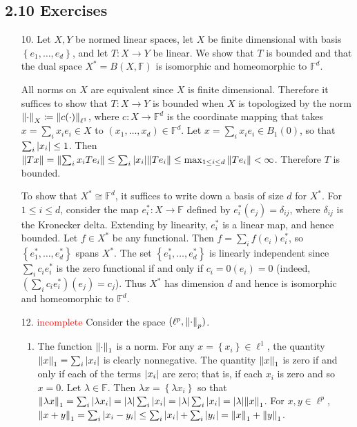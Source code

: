 \documentclass[11pt,leqno]{article}
\theoremstyle{plain}
\theoremstyle{definition}
\numberwithin{equation}{section}
\numberwithin{lem}{section}
\newcommand{\cbr}[1]{\left\{#1\right\}}
\begin{document}
\subsection*{2.10 Exercises}
\begin{enumerate}
  \item[10.] Let $X,Y$ be normed linear spaces, let $X$ be finite dimensional with basis $\cbr{e_1,\dots,e_d}$, and let $T\colon X\to Y$ be linear. We show that $T$ is bounded and that the dual space $X^\ast = B(X,\mathbb F)$ is isomorphic and homeomorphic to $\mathbb F^d$.
  
  All norms on $X$ are equivalent since $X$ is finite dimensional. Therefore it suffices to show that $T\colon X\to Y$ is bounded when $X$ is topologized by the norm $\norm{\cdot}_X\coloneqq \norm{c(\cdot)}_{\ell^1}$, where $c\colon X\to \mathbb F^d$ is the coordinate mapping that takes $x = \sum_ix_ie_i\in X$ to $(x_1,\dots,x_d)\in \mathbb F^d$. Let $x = \sum_i x_ie_i\in B_1(0)$, so that $\sum_i \abs{x_i} \leq 1$. Then $\norm{Tx} = \norm{\sum_i x_iTe_i}\leq \sum_i \abs{x_i} \norm{Te_i}\leq \max_{1\leq i\leq d}\norm{Te_i}< \infty$. Therefore $T$ is bounded.

  To show that $X^\ast\cong \mathbb F^d$, it suffices to write down a basis of size $d$ for $X^\ast$. For $1\leq i\leq d$, consider the map $e_i^\ast\colon X\to \mathbb F$ defined by $e_i^\ast(e_j) = \delta_{ij}$, where $\delta_{ij}$ is the Kronecker delta. Extending by linearity, $e_i^\ast$ is a linear map, and hence bounded. Let $f\in X^\ast$ be any functional. Then $f = \sum_i f(e_i)e_i^\ast$, so $\cbr{e_1^\ast,\dots,e_d^\ast}$ spans $X^\ast$. The set $\cbr{e_1^\ast,\dots,e_d^\ast}$ is linearly independent since $\sum_i c_ie_i^\ast$ is the zero functional if and only if $c_i = 0(e_i) = 0$ (indeed, $(\sum_i c_ie_i^\ast)(e_j) = c_j$). Thus $X^\ast$ has dimension $d$ and hence is isomorphic and homeomorphic to $\mathbb F^d$.
  
  \item[12.] \textcolor{red}{incomplete} Consider the space $(\ell^p, \norm{\cdot}_p)$.
  \begin{enumerate}
    \item The function $\norm{\cdot}_1$ is a norm. For any $x = \cbr{x_i}\in \ell^1$, the quantity $\norm{x}_1 = \sum_i \abs{x_i}$ is clearly nonnegative. The quantity $\norm{x}_1$ is zero if and only if each of the terms $\abs{x_i}$ are zero; that is, if each $x_i$ is zero and so $x = 0$. Let $\lambda\in \mathbb F$. Then $\lambda x = \cbr{\lambda x_i}$ so that $\norm{\lambda x}_1 = \sum_i \abs{\lambda x_i} = \abs{\lambda}\sum_i \abs{x_i} = \abs{\lambda}\sum_i \abs{x_i} = \abs{\lambda}\norm{x}_1$. For $x,y\in \ell^p$, $\norm{x+y}_1 = \sum_i\abs{x_i-y_i}\leq \sum_i \abs{x_i} + \sum_i\abs{y_i} = \norm{x}_1 + \norm{y}_1$.
    

\end{enumerate}
\end{enumerate}
\end{document}
